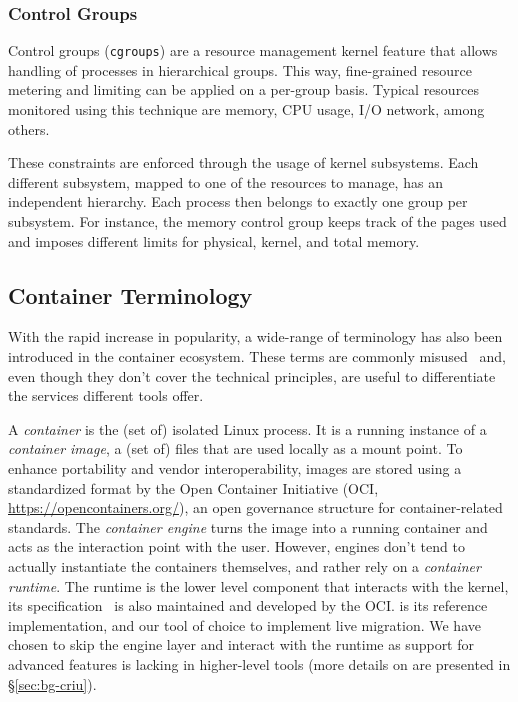 \subsubsection*{Control Groups}

Control groups (\texttt{cgroups}) are a resource management kernel feature that allows handling of processes in hierarchical groups.
This way, fine-grained resource metering and limiting can be applied on a per-group basis.
Typical resources monitored using this technique are memory, CPU usage, I/O network, among others.

These constraints are enforced through the usage of kernel subsystems.
Each different subsystem, mapped to one of the resources to manage, has an independent hierarchy.
Each process then belongs to exactly one group per subsystem.
For instance, the memory control group keeps track of the pages used and imposes different limits for physical, kernel, and total memory.

\subsection*{Container Terminology}

With the rapid increase in popularity, a wide-range of terminology has also been introduced in the container ecosystem.
These terms are commonly misused~\cite{McCarty2018} and, even though they don't cover the technical principles, are useful to differentiate the services different tools offer.

A \emph{container} is the (set of) isolated Linux process.
It is a running instance of a \emph{container image}, a (set of) files that are used locally as a mount point.
To enhance portability and vendor interoperability, images are stored using a standardized format by the Open Container Initiative (OCI, \url{https://opencontainers.org/}), an open governance structure for container-related standards.
The \emph{container engine} turns the image into a running container and acts as the interaction point with the user.
However, engines don't tend to actually instantiate the containers themselves, and rather rely on a \textit{container runtime}.
The runtime is the lower level component that interacts with the kernel, its specification~\cite{container-runtime-specification} is also maintained and developed by the OCI.
\runc is its reference implementation, and our tool of choice to implement live migration.
We have chosen to skip the engine layer and interact with the runtime as support for advanced \criu features is lacking in higher-level tools (more details on \criu are presented in \S\ref{sec:bg-criu}).

